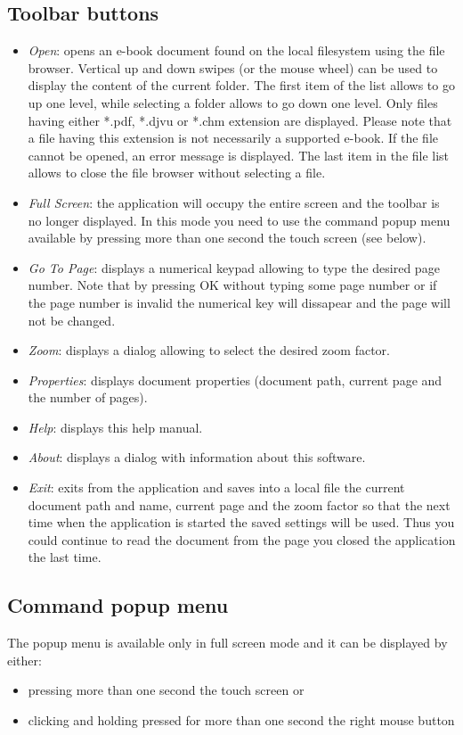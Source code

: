 \documentclass[journal,12pt]{IEEEtran}
\begin{document}
\subsection{Toolbar buttons}
\begin{itemize}
 \item \textit{Open}: opens an e-book document found on the local filesystem using the file browser. Vertical up and down swipes (or the mouse wheel) can be used to display the content of the current folder. The first item of the list allows to go up one level, while selecting a folder allows to go down one level. Only files having either *.pdf, *.djvu or *.chm extension are displayed. Please note that a file having this extension is not necessarily a supported e-book. If the file cannot be opened, an error message is displayed. The last item in the file list allows to close the file browser without selecting a file.
 \item \textit{Full Screen}: the application will occupy the entire screen and the toolbar is no longer displayed. In this mode you need to use the command popup menu available by pressing more than one second the touch screen (see below).
 \item \textit{Go To Page}: displays a numerical keypad allowing to type the desired page number. Note that by pressing OK without typing some page number or if the page number is invalid the numerical key will dissapear and the page will not be changed.
 \item \textit{Zoom}: displays a dialog allowing to select the desired zoom factor.
 \item \textit{Properties}: displays document properties (document path, current page and the number of pages).
 \item \textit{Help}: displays this help manual.
 \item \textit{About}: displays a dialog with information about this software.
 \item \textit{Exit}: exits from the application and saves into a local file the current document path and name, current page and the  zoom factor so that the next time when the application is started the saved settings will be used. Thus you could continue to read the document from the page you closed the application the last time.
\end{itemize}

\subsection{Command popup menu}
The popup menu is available only in full screen mode and it can be displayed by either:
\begin{itemize}
 \item pressing more than one second the touch screen or
 \item clicking and holding pressed for more than one second the right mouse button
\end{itemize}
\end{document}
